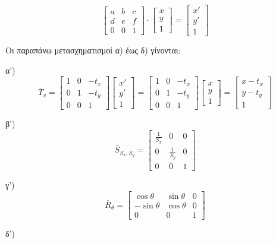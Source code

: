 \[
\begin{bmatrix} a & b & c \\ d & e & f \\ 0 & 0 & 1 \end{bmatrix} \cdot \begin{bmatrix} x \\ y \\ 1 \end{bmatrix} = \begin{bmatrix} x' \\ y' \\ 1 \end{bmatrix}
\]

 Οι παραπάνω μετασχηματισμοί α) έως δ) γίνονται:

 α') 
\[
\bar{T}_v= \begin{bmatrix} 1 & 0 & -t_x \\ 0 & 1 & -t_y \\ 0 & 0 & 1 \end{bmatrix} \begin{bmatrix} x' \\ y' \\ 1 \end{bmatrix} = \begin{bmatrix} 1 & 0 & -t_x \\ 0 & 1 & -t_y \\ 0 & 0 & 1 \end{bmatrix} \begin{bmatrix} x \\ y \\ 1 \end{bmatrix} = \begin{bmatrix} x - t_x \\ y - t_y \\ 1 \end{bmatrix}
\]

 β') 
\[
\bar{S}_{S_x,S_y} = \begin{bmatrix} \frac{1}{S_x} & 0 & 0 \\ 0 & \frac{1}{S_y} & 0 \\ 0 & 0 & 1 \end{bmatrix}
\]

 γ')   
\[
\bar{R}_{\theta} = \begin{bmatrix} \cos\theta & \sin\theta & 0 \\ -\sin\theta & \cos\theta & 0 \\ 0 & 0 & 1 \end{bmatrix}
\]

 δ') 

